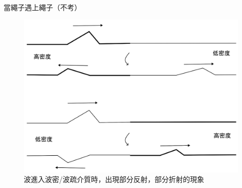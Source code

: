 \documentclass[beamer=true]{standalone}
\begin{document}





\begin{frame}{當繩子遇上繩子（不考）}
    \begin{figure}
        \centering
        \includegraphics[width=0.85\linewidth]{images/Screenshot 2023-09-28 at 10.16.23 AM.png}
        \caption{波進入波密/波疏介質時，出現部分反射，部分折射的現象}

    \end{figure}
\end{frame}
\end{document}
